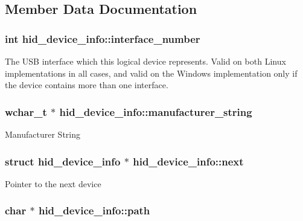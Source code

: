 \subsection{Member Data Documentation}
\hypertarget{structhid__device__info_a9163d8d5d7db8dc47bddfaf876e17547}{
\subsubsection[{interface\-\_\-number}]{\setlength{\rightskip}{0pt plus 5cm}int hid\-\_\-device\-\_\-info\-::interface\-\_\-number}}\label{structhid__device__info_a9163d8d5d7db8dc47bddfaf876e17547}
The U\-S\-B interface which this logical device represents. Valid on both Linux implementations in all cases, and valid on the Windows implementation only if the device contains more than one interface. \hypertarget{structhid__device__info_a69cda119ddde82c77dc2f43cb3760d15}{
\subsubsection[{manufacturer\-\_\-string}]{\setlength{\rightskip}{0pt plus 5cm}wchar\-\_\-t $\ast$ hid\-\_\-device\-\_\-info\-::manufacturer\-\_\-string}}\label{structhid__device__info_a69cda119ddde82c77dc2f43cb3760d15}
Manufacturer String \hypertarget{structhid__device__info_a22f653d5038cd1da1044f3b9b31f4666}{
\subsubsection[{next}]{\setlength{\rightskip}{0pt plus 5cm}struct {\bf hid\-\_\-device\-\_\-info} $\ast$ hid\-\_\-device\-\_\-info\-::next}}\label{structhid__device__info_a22f653d5038cd1da1044f3b9b31f4666}
Pointer to the next device \hypertarget{structhid__device__info_afd6f53bb5d44a34dabab013020d7e3e9}{
\subsubsection[{path}]{\setlength{\rightskip}{0pt plus 5cm}char $\ast$ hid\-\_\-device\-\_\-info\-::path}}\label{structhid__device__info_afd6f53bb5d44a34dabab013020d7e3e9}
